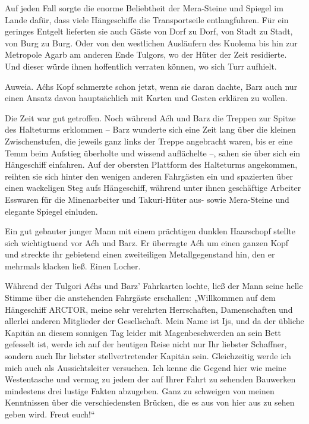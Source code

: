 Auf jeden Fall sorgte die enorme Beliebtheit der Mera-Steine und Spiegel im Lande dafür, dass viele Hängeschiffe die Transportseile entlangfuhren. Für ein geringes Entgelt lieferten sie auch Gäste von Dorf zu Dorf, von Stadt zu Stadt, von Burg zu Burg. Oder von den westlichen Ausläufern des Kuolema bis hin zur Metropole Agarb am anderen Ende Tulgors, wo der Hüter der Zeit residierte. Und dieser würde ihnen hoffentlich verraten können, wo sich Turr aufhielt.

Auweia. Aćhs Kopf schmerzte schon jetzt, wenn sie daran dachte, Barz auch nur einen Ansatz davon hauptsächlich mit Karten und Gesten erklären zu wollen.\bigskip







Die Zeit war gut getroffen. Noch während Aćh und Barz die Treppen zur Spitze des Halteturms erklommen – Barz wunderte sich eine Zeit lang über die kleinen Zwischenstufen, die jeweils ganz links der Treppe angebracht waren, bis er eine Temm beim Aufstieg überholte und wissend auflächelte –, sahen sie über sich ein Hängeschiff einfahren. Auf der obersten Plattform des Halteturms angekommen, reihten sie sich hinter den wenigen anderen Fahrgästen ein und spazierten über einen wackeligen Steg aufs Hängeschiff, während unter ihnen geschäftige Arbeiter Esswaren für die Minenarbeiter und Takuri-Hüter aus- sowie Mera-Steine und elegante Spiegel einluden.

Ein gut gebauter junger Mann mit einem prächtigen dunklen Haarschopf stellte sich wichtigtuend vor Aćh und Barz. Er überragte Aćh um einen ganzen Kopf und streckte ihr gebietend einen zweiteiligen Metallgegenstand hin, den er mehrmals klacken ließ. Einen Locher.

Während der Tulgori Aćhs und Barz’ Fahrkarten lochte, ließ der Mann seine helle Stimme über die anstehenden Fahrgäste erschallen: „Willkommen auf dem Hängeschiff ARCTOR, meine sehr verehrten Herrschaften, Damenschaften und allerlei anderen Mitglieder der Gesellschaft. Mein Name ist Ijs, und da der übliche Kapitän an diesem sonnigen Tag leider mit Magenbeschwerden an sein Bett gefesselt ist, werde ich auf der heutigen Reise nicht nur Ihr liebster Schaffner, sondern auch Ihr liebster stellvertretender Kapitän sein. Gleichzeitig werde ich mich auch als Aussichtsleiter versuchen. Ich kenne die Gegend hier wie meine Westentasche und vermag zu jedem der auf Ihrer Fahrt zu sehenden Bauwerken mindestens drei lustige Fakten abzugeben. Ganz zu schweigen von meinen Kenntnissen über die verschiedensten Brücken, die es aus von hier aus zu sehen geben wird. Freut euch!“

